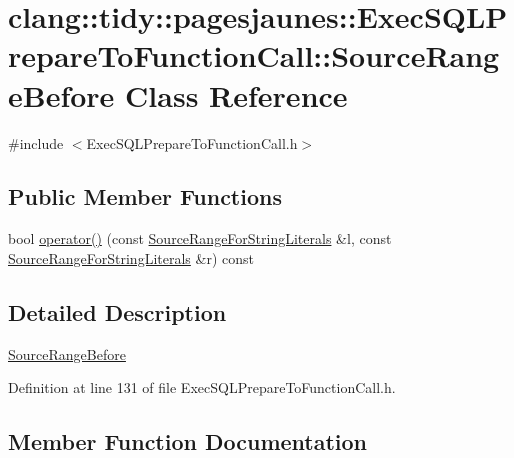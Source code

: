 \hypertarget{classclang_1_1tidy_1_1pagesjaunes_1_1_exec_s_q_l_prepare_to_function_call_1_1_source_range_before}{}\section{clang\+:\+:tidy\+:\+:pagesjaunes\+:\+:Exec\+S\+Q\+L\+Prepare\+To\+Function\+Call\+:\+:Source\+Range\+Before Class Reference}
\label{classclang_1_1tidy_1_1pagesjaunes_1_1_exec_s_q_l_prepare_to_function_call_1_1_source_range_before}


{\ttfamily \#include $<$Exec\+S\+Q\+L\+Prepare\+To\+Function\+Call.\+h$>$}

\subsection*{Public Member Functions}
\begin{DoxyCompactItemize}
\item 
bool \hyperlink{classclang_1_1tidy_1_1pagesjaunes_1_1_exec_s_q_l_prepare_to_function_call_1_1_source_range_before_ad466098556cf733639e6347f43e66b45}{operator()} (const \hyperlink{classclang_1_1tidy_1_1pagesjaunes_1_1_exec_s_q_l_prepare_to_function_call_1_1_source_range_for_string_literals}{Source\+Range\+For\+String\+Literals} \&l, const \hyperlink{classclang_1_1tidy_1_1pagesjaunes_1_1_exec_s_q_l_prepare_to_function_call_1_1_source_range_for_string_literals}{Source\+Range\+For\+String\+Literals} \&r) const
\end{DoxyCompactItemize}


\subsection{Detailed Description}
\hyperlink{classclang_1_1tidy_1_1pagesjaunes_1_1_exec_s_q_l_prepare_to_function_call_1_1_source_range_before}{Source\+Range\+Before} 

Definition at line 131 of file Exec\+S\+Q\+L\+Prepare\+To\+Function\+Call.\+h.



\subsection{Member Function Documentation}
\mbox{\label{classclang_1_1tidy_1_1pagesjaunes_1_1_exec_s_q_l_prepare_to_function_call_1_1_source_range_before_ad466098556cf733639e6347f43e66b45}} 
